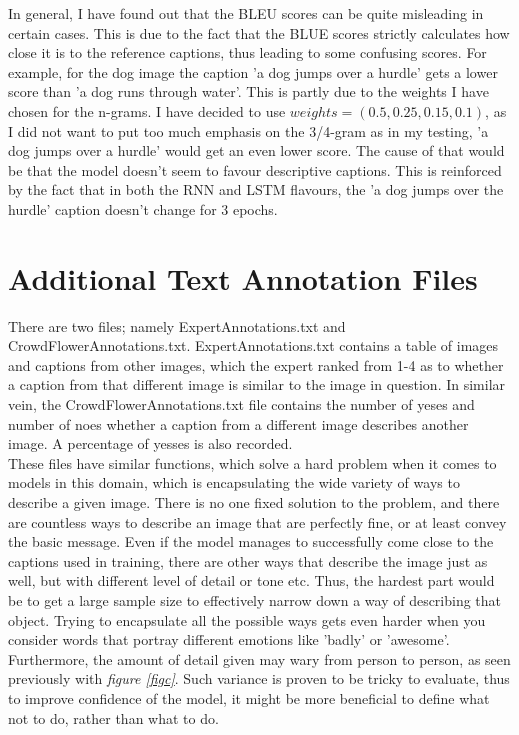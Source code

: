 \documentclass{article}
\begin{document}
    In general, I have found out that the BLEU scores can be quite misleading in certain cases. This is due to the fact that the BLUE scores strictly calculates how close it is to the reference captions, thus leading to some confusing scores. For example, for the dog image the caption 'a dog jumps over a hurdle' gets a lower score than 'a dog runs through water'. This is partly due to the weights I have chosen for the n-grams. I have decided to use $weights=(0.5, 0.25, 0.15, 0.1)$, as I did not want to put too much emphasis on the 3/4-gram as in my testing, 'a dog jumps over a hurdle' would get an even lower score. The cause of that would be that the model doesn't seem to favour descriptive captions. This is reinforced by the fact that in both the RNN and LSTM flavours, the 'a dog jumps over the hurdle' caption doesn't change for 3 epochs.\\





    \section{Additional Text Annotation Files}

    There are two files; namely ExpertAnnotations.txt and CrowdFlowerAnnotations.txt. ExpertAnnotations.txt contains a table of images and captions from other images, which the expert ranked from 1-4 as to whether a caption from that different image is similar to the image in question. In similar vein, the CrowdFlowerAnnotations.txt file contains the number of yeses and number of noes whether a caption from a different image describes another image. A percentage of yesses is also recorded.\\

    These files have similar functions, which solve a hard problem when it comes to models in this domain, which is encapsulating the wide variety of ways to describe a given image. There is no one fixed solution to the problem, and there are countless ways to describe an image that are perfectly fine, or at least convey the basic message. Even if the model manages to successfully come close to the captions used in training, there are other ways that describe the image just as well, but with different level of detail or tone etc. Thus, the hardest part would be to get a large sample size to effectively narrow down a way of describing that object. Trying to encapsulate all the possible ways gets even harder when you consider words that portray different emotions like 'badly' or 'awesome'. Furthermore, the amount of detail given may wary from person to person, as seen previously with \textit{figure \ref{figc}}. Such variance is proven to be tricky to evaluate, thus to improve confidence of the model, it might be more beneficial to define what not to do, rather than what to do.\\ 
\end{document}
